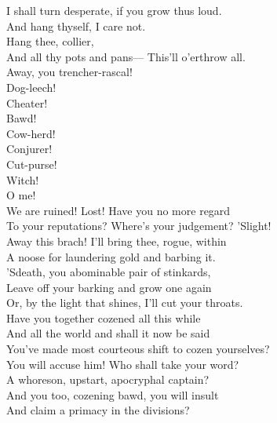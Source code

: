 \documentclass[a4paper,oneside,12pt]{memoir}
\begin{document}
\begin{drama*}
\facespeaks I shall turn desperate, if you grow thus loud.\\
\subtlespeaks And hang thyself, I care not.\\
\facespeaks {} Hang thee, collier,\\
And all thy pots and pans---
\dolspeaks {} This'll o'erthrow all.\\
\subtlespeaks Away, you trencher-rascal!\\
\facespeaks {} Dog-leech!\\
\subtlespeaks  {} Cheater!\\
\facespeaks Bawd!\\
\subtlespeaks {} Cow-herd!\\
\facespeaks {} Conjurer!\\
\subtlespeaks {} Cut-purse!\\
\facespeaks {} Witch!\\
\dolspeaks {} O me!\\
We are ruined! Lost! Have you no more regard\\
To your reputations? Where's your judgement? 'Slight!\\
\facespeaks Away this brach! I'll bring thee, rogue, within\\
A noose for laundering gold and barbing it.\\
\dolspeaks 'Sdeath, you abominable pair of stinkards,\\
Leave off your barking and grow one again\\
Or, by the light that shines, I'll cut your throats.\\
Have you together cozened all this while\\
And all the world and shall it now be said\\
You've made most courteous shift to cozen yourselves?\\
You will accuse him! Who shall take your word?\\
A whoreson, upstart, apocryphal captain?\\
And you too, cozening bawd, you will insult\\
And claim a primacy in the divisions?\\

\end{drama*}
\end{document}
